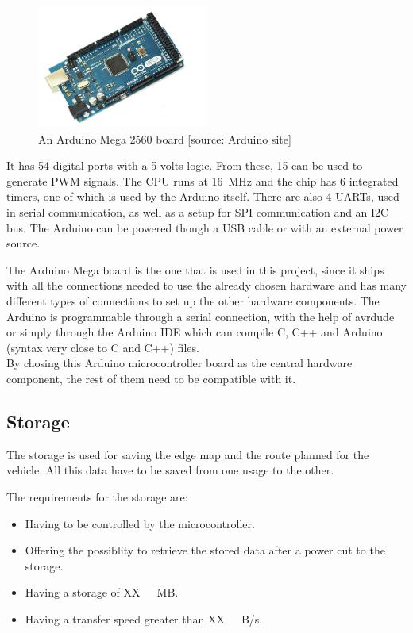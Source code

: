 \begin{figure}[H]
	\centering
	\includegraphics[width=0.5\textwidth]{figures/ArduinoMega.png}
		\caption{An Arduino Mega 2560 board [source: Arduino site]} 
	\label{ArduinoMega}
\end{figure}
%
It has \si{54} digital ports with a 5 volts logic. From these, \si{15} can be used to generate PWM signals. The CPU runs at \si{16 MHz} and the chip has \si{6} integrated timers, one of which is used by the Arduino itself. There are also 4 UARTs, used in serial communication, as well as a setup for SPI communication and an I2C bus. The Arduino can be powered though a USB cable or with an external power source.

The Arduino Mega board is the one that is used in this project, since it ships with all the connections needed to use the already chosen hardware and has many different types of connections to set up the other hardware components. The Arduino is programmable through a serial connection, with the help of avrdude\cite{Avrdude} or simply through the Arduino IDE\cite{ArduinoIDE} which can compile C, C++ and Arduino (syntax very close to C and C++) files.\\
%
By chosing this Arduino microcontroller board as the central hardware component, the rest of them need to be compatible with it.


\subsection{Storage}
The storage is used for saving the edge map and the route planned for the vehicle. All this data have to be saved from one usage to the other.

The requirements for the storage are:
\begin{itemize}
\item Having to be controlled by the microcontroller.
\item Offering the possiblity to retrieve the stored data after a power cut to the storage.
\item Having a storage of \si{XX\ MB}. 
\item Having a transfer speed greater than \si{XX\ B/s}. 
\end{itemize}

